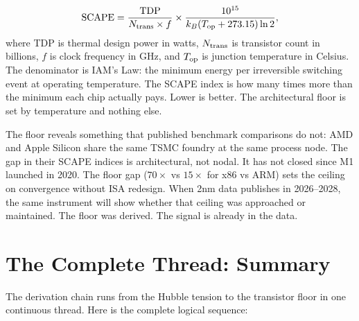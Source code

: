 \documentclass[12pt,a4paper]{article}
\begin{document}
\begin{equation}
{\rm SCAPE} = \frac{{\rm TDP}}{N_{\rm trans} \times f}
\times \frac{10^{15}}{k_B (T_{\rm op} + 273.15) \ln 2},
\end{equation}
where TDP is thermal design power in watts, $N_{\rm trans}$ is transistor count
in billions, $f$ is clock frequency in GHz, and $T_{\rm op}$ is junction
temperature in Celsius. The denominator is IAM's Law: the minimum energy per
irreversible switching event at operating temperature. The SCAPE index is how
many times more than the minimum each chip actually pays. Lower is better.
The architectural floor is set by temperature and nothing else.

The floor reveals something that published benchmark comparisons do not: AMD and
Apple Silicon share the same TSMC foundry at the same process node. The gap in
their SCAPE indices is architectural, not nodal. It has not closed since M1
launched in 2020. The floor gap ($70\times$ vs $15\times$ for x86 vs ARM)
sets the ceiling on convergence without ISA redesign. When 2nm data publishes
in 2026--2028, the same instrument will show whether that ceiling was approached
or maintained. The floor was derived. The signal is already in the data.

\newpage

\section{The Complete Thread: Summary}
\label{sec:summary}

The derivation chain runs from the Hubble tension to the transistor floor in
one continuous thread. Here is the complete logical sequence:
\end{document}
